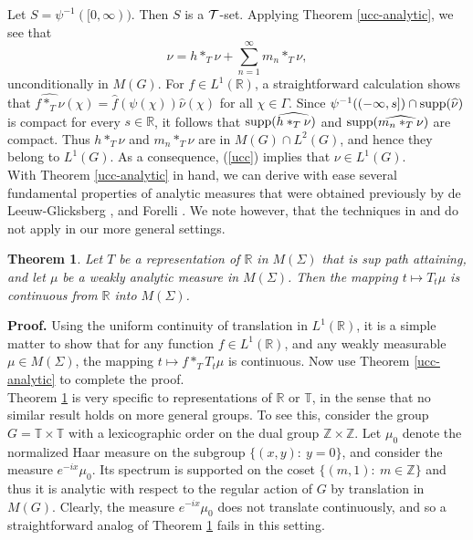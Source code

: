 \documentclass[12pt]{article}
\newcommand{\R}{\mathbb R}
\newcommand{\Z}{\mathbb Z}
\newcommand{\T}{\mathbb T}
\newcommand{\supp}{{\rm supp}}
\newcommand{\cT}{{\cal T}}
\newtheorem{thm}[defin]{Theorem}
\begin{document}
Let $S=\psi^{-1}([0,\infty))$.  Then $S$ is a $\cT$-set.  Applying Theorem \ref{ucc-analytic}, we see that
\begin{equation}
\nu=h*_T\nu +\sum_{n=1}^\infty m_n*_T \nu,
\label{ucc}
\end{equation}
unconditionally in $M(G)$.
For $f\in L^1(\R)$, a 
straightforward calculation shows that
$\widehat{f*_T\nu}(\chi)=\widehat{f}(\psi (\chi))\widehat{\nu}(\chi)$ for all
$\chi\in\Gamma$.  
Since
$\psi^{-1}((-\infty,s])\cap \supp (\widehat{\nu})$ is compact
for every $s\in \R$, it follows that
  $\supp(\widehat{h*_T\nu})$ 
and $\supp(\widehat{m_n*_T\nu})$
are compact.  Thus $h*_T\nu$ and $m_n*_T\nu$ 
are in $M(G)\cap L^2(G)$, and hence they belong to $L^1(G)$.
As a consequence, (\ref{ucc}) implies that 
$\nu\in L^1(G)$.\\



With Theorem \ref{ucc-analytic} in hand, we can derive with ease
several fundamental properties of analytic measures
that were obtained previously by 
 de Leeuw-Glicksberg
\cite{deleeuwglicksberg}, and
Forelli \cite{forelli}.  We note however, that the techniques
in \cite{deleeuwglicksberg} and \cite{forelli} do not apply
in our more general settings.
\begin{thm}
Let $T$ be a representation of $\R$ in $M(\Sigma)$
that is sup path attaining,
and let $\mu$ be a
weakly analytic measure in $ M(\Sigma)$.
Then the mapping $t\mapsto T_t \mu$ is 
continuous from $\R$ into $M(\Sigma)$.
\label{general-forelli}
\end{thm}
{\bf Proof.}  Using the uniform continuity
of translation in $L^1(\R)$, it is a simple matter to show that
for any function $f\in L^1(\R)$, and any weakly measurable
$\mu\in M(\Sigma)$, the mapping
$t\mapsto f*_T T_t\mu$ is continuous.
Now use Theorem \ref{ucc-analytic} to complete the proof.\\

Theorem \ref{general-forelli} is very specific to
representations of $\R$ or $\T$, in the sense that
no similar result holds on more general groups.
To see this, consider the 
group $G=\T\times \T$ with a lexicographic order on the dual
group $\Z\times \Z$.  Let $\mu_0$ denote the normalized Haar
measure on the subgroup $\{(x,y):\ y=0\}$, and consider the measure
$e^{-i x}\mu_0$.  Its spectrum is supported on
the coset $\{(m,1):\ m\in \Z\}$ and thus it is
analytic with respect to the
regular action of $G$ by translation in
$M(G)$.  Clearly, the measure $e^{-i x}\mu_0$
does not translate continuously, and so
a straightforward analog of 
Theorem \ref{general-forelli}
fails in this setting.
\end{document}
